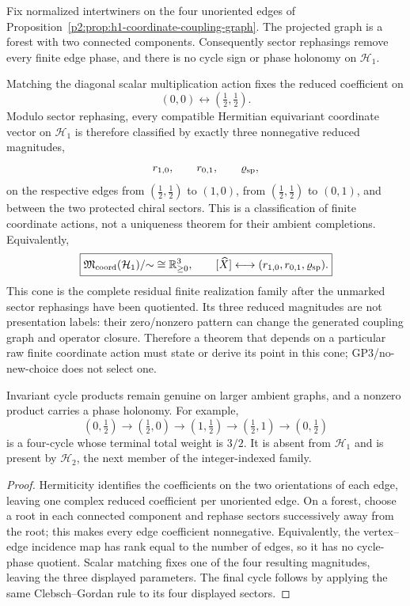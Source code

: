 \documentclass[12pt,a4paper]{article}
\begin{document}
\begin{corollary}[Complete finite coordinate classification at \(m=1\)]
\label{p2:cor:h1-coordinate-classification}
Fix normalized intertwiners on the four unoriented edges of
Proposition~\ref{p2:prop:h1-coordinate-coupling-graph}.  The projected graph
is a forest with two connected components.  Consequently sector rephasings
remove every finite edge phase, and there is no cycle sign or phase holonomy
on \(\mathcal H_1\).

Matching the diagonal scalar multiplication action fixes the reduced
coefficient on
\[
        (0,0)\leftrightarrow(\tfrac12,\tfrac12).
\]
Modulo sector rephasing, every compatible Hermitian equivariant coordinate
vector on \(\mathcal H_1\) is therefore classified by exactly three
nonnegative reduced magnitudes,
\[
        r_{1,0},\qquad r_{0,1},\qquad \varrho_{\rm sp},
\]
on the respective edges from \((\tfrac12,\tfrac12)\) to \((1,0)\), from
\((\tfrac12,\tfrac12)\) to \((0,1)\), and between the two protected chiral
sectors.  This is a classification of finite coordinate actions, not a
uniqueness theorem for their ambient completions.
Equivalently,
\[
 \boxed{
 \mathfrak M_{\rm coord}(\mathcal H_1)/{\sim}
 \cong\mathbb R_{\ge0}^{3},
 \qquad
 [\widehat X]\longleftrightarrow
 (r_{1,0},r_{0,1},\varrho_{\rm sp}) .}
\]
This cone is the complete residual finite realization family after the
unmarked sector rephasings have been quotiented.  Its three reduced
magnitudes are not presentation labels: their zero/nonzero pattern can change
the generated coupling graph and operator closure.  Therefore a theorem that
depends on a particular raw finite coordinate action must state or derive its
point in this cone; GP3/no-new-choice does not select one.

Invariant cycle products remain genuine on larger ambient graphs, and a
nonzero product carries a phase holonomy.  For example,
\[
(0,\tfrac12)\to(\tfrac12,0)\to(1,\tfrac12)
\to(\tfrac12,1)\to(0,\tfrac12)
\]
is a four-cycle whose terminal total weight is \(3/2\).  It is absent from
\(\mathcal H_1\) and is present by \(\mathcal H_2\), the next member of the
integer-indexed family.
\end{corollary}

\begin{proof}
Hermiticity identifies the coefficients on the two orientations of each
edge, leaving one complex reduced coefficient per unoriented edge.  On a
forest, choose a root in each connected component and rephase sectors
successively away from the root; this makes every edge coefficient
nonnegative.  Equivalently, the vertex--edge incidence map has rank equal to
the number of edges, so it has no cycle-phase quotient.  Scalar matching
fixes one of the four resulting magnitudes, leaving the three displayed
parameters.  The final cycle follows by applying the same
Clebsch--Gordan rule to its four displayed sectors.
\end{proof}
\end{document}
